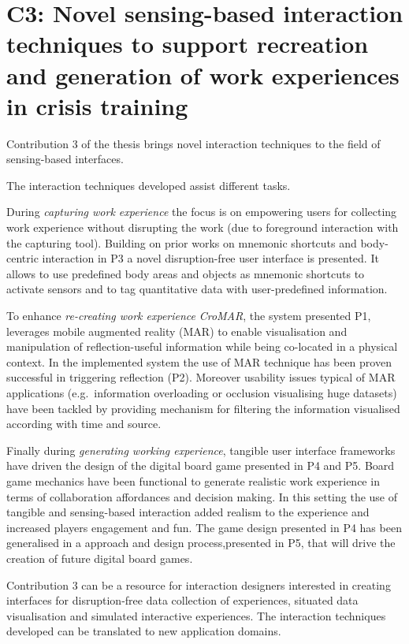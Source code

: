 \section[C3: Novel sensing-based interaction techniques to support recreation and generation of work experiences in crisis training][Contribution 3]{C3: Novel sensing-based interaction techniques to support recreation and generation of work experiences in crisis training}\label{c3}

Contribution 3 of the thesis brings novel interaction techniques to the field of sensing-based interfaces.

The interaction techniques developed assist different tasks.

During \emph{capturing work experience} the focus is on empowering users for collecting work experience without disrupting the work (due to foreground interaction with the capturing tool). Building on prior works on mnemonic shortcuts \autocite{Guerreiro:2008wt} and body-centric interaction \autocite{Chen:2012wk} in P3 a novel disruption-free user interface is presented. It allows to use predefined body areas and objects as mnemonic shortcuts to activate sensors and to tag quantitative data with user-predefined information.

To enhance \emph{re-creating work experience} \emph{CroMAR}, the system presented P1, leverages mobile augmented reality (MAR) to enable visualisation and manipulation of reflection-useful information while being co-located in a physical context. In the implemented system the use of MAR technique has been proven successful in triggering reflection (P2). Moreover usability issues typical of MAR applications (e.g.~information overloading or occlusion visualising huge datasets) have been tackled by providing mechanism for filtering the information visualised according with time and source.

Finally during \emph{generating working experience}, tangible user interface frameworks have driven the design of the digital board game presented in P4 and P5. Board game mechanics have been functional to generate realistic work experience in terms of collaboration affordances and decision making. In this setting the use of tangible and sensing-based interaction added realism to the experience and increased players engagement and fun. The game design presented in P4 has been generalised in a approach and design process,presented in P5, that will drive the creation of future digital board games.

Contribution 3 can be a resource for interaction designers interested in creating interfaces for disruption-free data collection of experiences, situated data visualisation and simulated interactive experiences. The interaction techniques developed can be translated to new application domains.

